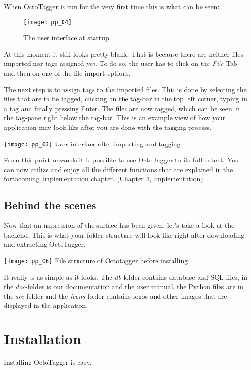 When OctoTagger is run for the very first time this is what can be seen:

\begin{figure}[H]
    \centering
    \texttt{[image: pp\_04]}
    \caption{The user interface at startup}
\end{figure}


At this moment it still looks pretty blank. That is because there are neither files imported nor tags assigned yet. To do so, the user has to click on the \emph{File}-Tab and then on one of the file import options.

The next step is to assign tags to the imported files. This is done by selecting the files that are to be tagged, clicking on the tag-bar in the top left corner, typing in a tag and finally pressing Enter. The files are now tagged, which can be seen in the tag-pane right below the tag-bar.
This is an example view of how your application may look like after you are done with the tagging process.

\begin{center}
\texttt{[image: pp\_03]}
\small{User interface after importing and tagging}
\end{center}


From this point onwards it is possible to use OctoTagger to its full extent. You can now utilize and enjoy all the different functions that are explained in the forthcoming Implementation chapter. (Chapter 4, Implementation)

\subsection{Behind the scenes}
Now that an impression of the surface has been given, let's take a look at the backend. This is what your folder structure will look like right after downloading and extracting OctoTagger:

\begin{center}
\texttt{[image: pp\_06]}
\small{File structure of Octotagger before installing}
\end{center}

It really is as simple as it looks. The \emph{db}-folder contains database and SQL files, in the \emph{doc}-folder is our documentation and the user manual, the Python files are in the \emph{src}-folder and the \emph{icons}-folder contains logos and other images that are displayed in the application.

\section{Installation}
Installing OctoTagger is easy.

